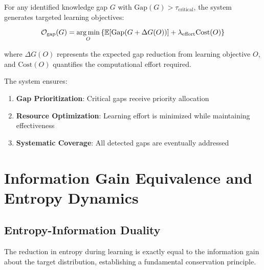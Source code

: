 \begin{theorem}
\label{thm:gap_resolution}
For any identified knowledge gap $G$ with $\text{Gap}(G) > \tau_{\text{critical}}$, the system generates targeted learning objectives:

\begin{equation}
\mathcal{O}_{\text{gap}}(G) = \mathop{\mathrm{arg\,min}}_{O} \left\{ \mathbb{E}[\text{Gap}(G + \Delta G(O))] + \lambda_{\text{effort}} \text{Cost}(O) \right\}
\end{equation}

where $\Delta G(O)$ represents the expected gap reduction from learning objective $O$, and $\text{Cost}(O)$ quantifies the computational effort required.

The system ensures:
\begin{enumerate}
    \item \textbf{Gap Prioritization}: Critical gaps receive priority allocation
    \item \textbf{Resource Optimization}: Learning effort is minimized while maintaining effectiveness
    \item \textbf{Systematic Coverage}: All detected gaps are eventually addressed
\end{enumerate}
\end{theorem}

\section{Information Gain Equivalence and Entropy Dynamics}

\subsection{Entropy-Information Duality}

The reduction in entropy during learning is exactly equal to the information gain about the target distribution, establishing a fundamental conservation principle.

